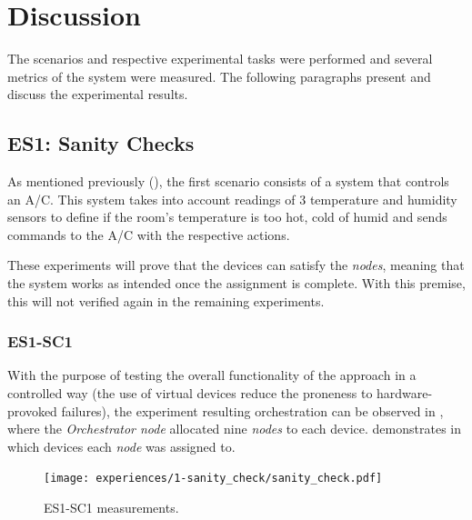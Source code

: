\section{Discussion}\label{sec:evaluation_discussion}

The scenarios and respective experimental tasks were performed and several metrics of the system were measured. The following paragraphs present and discuss the experimental results.

\subsection{ES1: Sanity Checks}\label{sec:discussion_scenario1}

As mentioned previously (\cf {}), the first scenario consists of a system that controls an A/C. This system takes into account readings of 3 temperature and humidity sensors to define if the room's temperature is too hot, cold of humid and sends commands to the A/C with the respective actions.

These experiments will prove that the devices can satisfy the \textit{nodes}, meaning that the system works as intended once the assignment is complete. With this premise, this will not verified again in the remaining experiments.


\subsubsection{ES1-SC1}\label{sec:sanity_check_exp}

With the purpose of testing the overall functionality of the approach in a controlled way (the use of virtual devices reduce the proneness to hardware-provoked failures), the experiment resulting orchestration can be observed in , where the \textit{Orchestrator node} allocated nine \textit{nodes} to each device.  demonstrates in which devices each \textit{node} was assigned to.

\begin{figure}[h]
\centering
\texttt{[image: experiences/1-sanity\_check/sanity\_check.pdf]}
\caption[ES1-SC1 measurements.]{ES1-SC1 measurements.}\label{fig:sanity_check_graph}
\end{figure}


